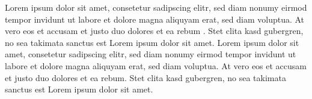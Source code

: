 \documentclass[12pt, a4paper]{scrartcl}
\title{\documentTitle}
\author{\forename\:\surname}
\date{\dateOfWork}
\begin{document}



\tableofcontents
\newpage

Lorem ipsum dolor sit amet, consetetur sadipscing elitr, sed diam nonumy eirmod tempor invidunt ut labore et dolore magna aliquyam erat, sed diam voluptua. At vero eos et accusam et justo duo dolores et ea rebum \parencite[vgl.][]{source1}. Stet clita kasd gubergren, no sea takimata sanctus est Lorem ipsum dolor sit amet. Lorem ipsum dolor sit amet, consetetur sadipscing elitr, sed diam nonumy eirmod tempor invidunt ut labore et dolore magna aliquyam erat, sed diam voluptua. At vero eos et accusam et justo duo dolores et ea rebum. Stet clita kasd gubergren, no sea takimata sanctus est Lorem ipsum dolor sit amet.


\end{document}
